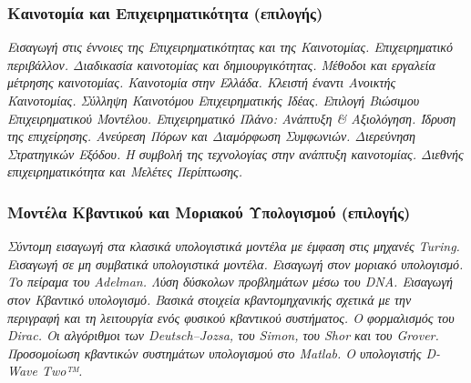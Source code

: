 \hypertarget{ux3baux3b1ux3b9ux3bdux3bfux3c4ux3bfux3bcux3afux3b1-ux3baux3b1ux3b9-ux3b5ux3c0ux3b9ux3c7ux3b5ux3b9ux3c1ux3b7ux3bcux3b1ux3c4ux3b9ux3baux3ccux3c4ux3b7ux3c4ux3b1-ux3b5ux3c0ux3b9ux3bbux3bfux3b3ux3aeux3c2}{%
\subsubsection{Καινοτομία και Επιχειρηματικότητα
(επιλογής)}\label{ux3baux3b1ux3b9ux3bdux3bfux3c4ux3bfux3bcux3afux3b1-ux3baux3b1ux3b9-ux3b5ux3c0ux3b9ux3c7ux3b5ux3b9ux3c1ux3b7ux3bcux3b1ux3c4ux3b9ux3baux3ccux3c4ux3b7ux3c4ux3b1-ux3b5ux3c0ux3b9ux3bbux3bfux3b3ux3aeux3c2}}

\emph{Εισαγωγή στις έννοιες της Επιχειρηματικότητας και της Καινοτομίας.
Eπιχειρηματικό περιβάλλον. Διαδικασία καινοτομίας και δημιουργικότητας.
Μέθοδοι και εργαλεία μέτρησης καινοτομίας. Καινοτομία στην Ελλάδα.
Κλειστή έναντι Ανοικτής Καινοτομίας. Σύλληψη Καινοτόμου Επιχειρηματικής
Ιδέας. Επιλογή Βιώσιμου Επιχειρηματικού Μοντέλου. Επιχειρηματικό Πλάνο:
Ανάπτυξη \& Αξιολόγηση. Ίδρυση της επιχείρησης. Ανεύρεση Πόρων και
Διαμόρφωση Συμφωνιών. Διερεύνηση Στρατηγικών Εξόδου. Η συμβολή της
τεχνολογίας στην ανάπτυξη καινοτομίας. Διεθνής επιχειρηματικότητα και
Μελέτες Περίπτωσης.}

\hypertarget{ux3bcux3bfux3bdux3c4ux3adux3bbux3b1-ux3baux3b2ux3b1ux3bdux3c4ux3b9ux3baux3bfux3cd-ux3baux3b1ux3b9-ux3bcux3bfux3c1ux3b9ux3b1ux3baux3bfux3cd-ux3c5ux3c0ux3bfux3bbux3bfux3b3ux3b9ux3c3ux3bcux3bfux3cd-ux3b5ux3c0ux3b9ux3bbux3bfux3b3ux3aeux3c2}{%
\subsubsection{Μοντέλα Κβαντικού και Μοριακού Υπολογισμού
(επιλογής)}\label{ux3bcux3bfux3bdux3c4ux3adux3bbux3b1-ux3baux3b2ux3b1ux3bdux3c4ux3b9ux3baux3bfux3cd-ux3baux3b1ux3b9-ux3bcux3bfux3c1ux3b9ux3b1ux3baux3bfux3cd-ux3c5ux3c0ux3bfux3bbux3bfux3b3ux3b9ux3c3ux3bcux3bfux3cd-ux3b5ux3c0ux3b9ux3bbux3bfux3b3ux3aeux3c2}}

\emph{Σύντομη εισαγωγή στα κλασικά υπολογιστικά μοντέλα με έμφαση στις
μηχανές Turing. Εισαγωγή σε μη συμβατικά υπολογιστικά μοντέλα. Εισαγωγή
στον μοριακό υπολογισμό. Το πείραμα του Adelman. Λύση δύσκολων
προβλημάτων μέσω του DNA. Εισαγωγή στον Κβαντικό υπολογισμό. Βασικά
στοιχεία κβαντομηχανικής σχετικά με την περιγραφή και τη λειτουργία ενός
φυσικού κβαντικού συστήματος. Ο φορμαλισμός του Dirac. Οι αλγόριθμοι των
Deutsch--Jozsa, του Simon, του Shor και του Grover. Προσομοίωση
κβαντικών συστημάτων υπολογισμού στο Matlab. Ο υπολογιστής D-Wave Two™.}

